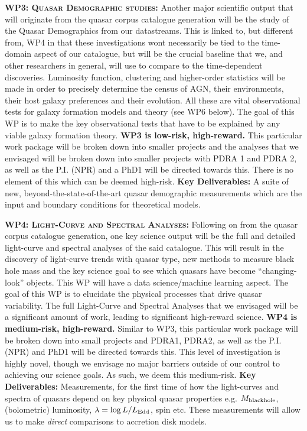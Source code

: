 \documentclass[oneside, a4paper, onecolumn, 11pt]{article}
\begin{document}
\smallskip
\smallskip
\noindent
\textbf{\textsc{WP3: Quasar Demographic studies:}} 
Another major scientific output that will originate from the quasar
corpus catalogue generation will be the study of the Quasar
Demographics from our datastreams. This is linked to, but different from, WP4 in that
these investigations wont necessarily be tied to the time-domain
aspect of our catalogue, but will be the crucial baseline that we, and
other researchers in general, will use to compare to the time-dependent
discoveries. Luminosity function, clustering and higher-order
statistics will be made in order to precisely determine the census of
AGN, their environments, their host galaxy preferences and their
evolution. All these are vital observational tests for galaxy
formation models and theory (see WP6 below).
The goal of this WP is to make the key observational tests that have
to be explained by any viable galaxy formation theory.  
{\bf WP3 is low-risk, high-reward.}
This particular work package will be broken down into smaller projects
and the analyses that we envisaged will be broken down into smaller
projects with PDRA 1 and PDRA 2, as
well as the P.I. (NPR) and a PhD1 will be directed
towards this. There is no element of this which can be deemed
high-risk.
{\bf Key Deliverables:} A suite of new, beyond-the-state-of-the-art 
quasar demographic measurements which are the input 
and boundary conditions for theoretical models. 


\smallskip
\smallskip
\noindent
\textbf{\textsc{WP4: Light-Curve and Spectral Analyses:}} 
Following on from the quasar corpus catalogue generation, one key
science output will be the full and detailed light-curve and spectral
analyses of the said catalogue. This will result in the discovery of
light-curve trends with quasar type, new methods to measure black hole
mass and the key science goal to see which quasars have become
``changing-look'' objects. This WP will have a data science/machine learning 
aspect.
The goal of this WP is to elucidate the physical processes that drive quasar variability.
The full Light-Curve and Spectral
Analyses that we envisaged will be a significant amount of work,
leading to significant high-reward science. 
{\bf WP4 is medium-risk, high-reward.}
Similar to WP3, this particular work
package will be broken down into small projects and 
PDRA1, PDRA2, as well as the P.I. (NPR) and PhD1 will be directed towards this. This level of investigation 
is highly novel, though we envisage no major barriers outside of our control to
 achieving our science goals. As such, we deem this medium-risk.
{\bf Key Deliverables:} Measurements, for the first time of how the 
light-curves and spectra of quasars depend on key physical 
quasar properties e.g. $M_{\rm black hole}$, (bolometric) luminosity, $\lambda = \log L / L_{\rm Edd}$, spin etc. 
These measurements will allow us to make {\it direct} comparisons to accretion disk models. 
\end{document}
